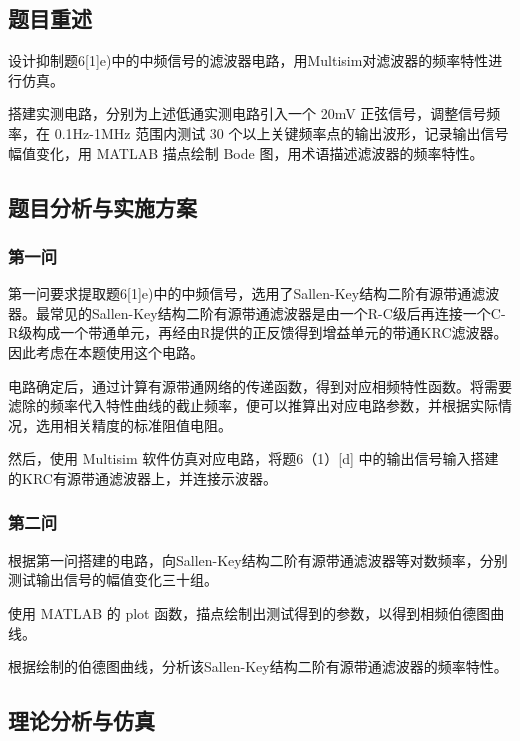 \documentclass[./测控三级项目.tex]{subfiles} %
\begin{document}
	\subsection{题目重述}
		\begin{compactenum}
			\item 设计抑制题6[1]e)中的中频信号的滤波器电路，用Multisim对滤波器的频率特性进行仿真。
			\item 搭建实测电路，分别为上述低通实测电路引入一个 20mV 正弦信号，调整信号频率，在 0.1Hz-1MHz 范围内测试 30 个以上关键频率点的输出波形，记录输出信号幅值变化，用 MATLAB 描点绘制 Bode 图，用术语描述滤波器的频率特性。
		\end{compactenum}
	\subsection{题目分析与实施方案}
		\subsubsection{第一问}
			第一问要求提取题6[1]e)中的中频信号，选用了Sallen-Key结构二阶有源带通滤波器。最常见的Sallen-Key结构二阶有源带通滤波器是由一个R-C级后再连接一个C-R级构成一个带通单元，再经由R提供的正反馈得到增益单元的带通KRC滤波器。因此考虑在本题使用这个电路。 \par
			电路确定后，通过计算有源带通网络的传递函数，得到对应相频特性函数。将需要滤除的频率代入特性曲线的截止频率，便可以推算出对应电路参数，并根据实际情况，选用相关精度的标准阻值电阻。 \par
			然后，使用 Multisim 软件仿真对应电路，将题6（1）[d] 中的输出信号输入搭建的KRC有源带通滤波器上，并连接示波器。\par
		\subsubsection{第二问}
			根据第一问搭建的电路，向Sallen-Key结构二阶有源带通滤波器等对数频率，分别测试输出信号的幅值变化三十组。\par 
			使用 MATLAB 的 plot 函数，描点绘制出测试得到的参数，以得到相频伯德图曲线。\par 
			根据绘制的伯德图曲线，分析该Sallen-Key结构二阶有源带通滤波器的频率特性。
	\subsection{理论分析与仿真}
\end{document}
